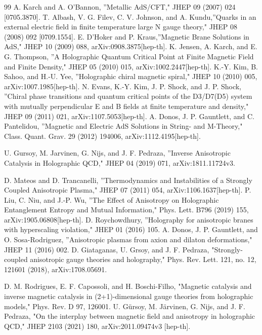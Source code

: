 \documentclass[]{article}
\begin{document}
\begin{thebibliography}{99}
 A. Karch and A. O'Bannon, ''Metallic AdS/CFT," JHEP 09 (2007) 024 [0705.3870].
T. Albash, V. G. Filev, C. V. Johnson, and A. Kundu,''Quarks in an external electric field in
finite temperature large N gauge theory," JHEP 08 (2008) 092 [0709.1554].
E. D'Hoker and P. Kraus,''Magnetic Brane Solutions in AdS," JHEP 10 (2009) 088, arXiv:0908.3875[hep-th].
K. Jensen, A. Karch, and E. G. Thompson, ''A Holographic Quantum Critical Point at Finite
Magnetic Field and Finite Density," JHEP 05 (2010) 015, arXiv:1002.2447[hep-th].
K.-Y. Kim, B. Sahoo, and H.-U. Yee, ''Holographic chiral magnetic spiral," JHEP 10 (2010)
005, arXiv:1007.1985[hep-th].
N. Evans, K.-Y. Kim, J. P. Shock, and J. P. Shock, ''Chiral phase transitions and quantum
critical points of the D3/D7(D5) system with mutually perpendicular E and B fields at finite
temperature and density," JHEP 09 (2011) 021, arXiv:1107.5053[hep-th].
A. Donos, J. P. Gauntlett, and C. Pantelidou, ''Magnetic and Electric AdS Solutions in
String- and M-Theory," Class. Quant. Grav. 29 (2012) 194006, arXiv:1112.4195[hep-th].



U. Gursoy, M. Jarvinen, G. Nijs, and J. F. Pedraza, ''Inverse Anisotropic Catalysis in Holographic QCD," JHEP 04 (2019) 071,  arXiv:1811.11724v3.

D. Mateos and D. Trancanelli, ''Thermodynamics and Instabilities of a Strongly Coupled
Anisotropic Plasma," JHEP 07 (2011) 054, arXiv:1106.1637[hep-th].
P. Liu, C. Niu, and J.-P. Wu, ''The Effect of Anisotropy on Holographic Entanglement Entropy
and Mutual Information," Phys. Lett. B796 (2019) 155, arXiv:1905.06808[hep-th].
D. Roychowdhury, ''Holography for anisotropic branes with hyperscaling violation," JHEP 01
(2016) 105.
A. Donos, J. P. Gauntlett, and O. Sosa-Rodriguez, ''Anisotropic plasmas from axion and
dilaton deformations," JHEP 11 (2016) 002.
 D. Giataganas, U. Grsoy, and J. F. Pedraza, "Strongly-coupled anisotropic gauge theories and holography," Phys. Rev. Lett. 121, no. 12, 121601 (2018), arXiv:1708.05691.


D. M. Rodrigues, E. F. Capossoli, and H. Boschi-Filho, "Magnetic catalysis and inverse magnetic catalysis in (2+1)-dimensional gauge theories from holographic models," Phys. Rev. D 97, 126001.
U. Gürsoy, M. Järvinen, G. Nijs, and J. F. Pedraza, "On the interplay between magnetic field and anisotropy in holographic QCD," JHEP 2103 (2021) 180, arXiv:2011.09474v3 [hep-th].



\end{thebibliography}
\end{document}
